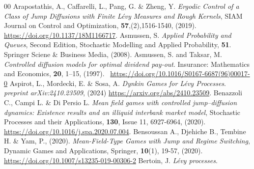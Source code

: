 \documentclass{article}
\begin{document}
\begin{thebibliography}{00}
Arapostathis, A., Caffarelli, L., Pang, G. \& Zheng, Y. \textit{Ergodic Control of a Class of Jump Diffusions with Finite Lévy Measures and Rough Kernels}, SIAM Journal on Control and Optimization,
\textbf{57},(2),1516-1540, (2019).
\url{https://doi.org/10.1137/18M1166717}.
Asmussen, S. \textit{Applied Probability and Queues}, Second Edition, Stochastic Modelling and Applied Probability, \textbf{51}. Springer Sciene \& Business Media, (2008). 
Asmussen, S. and Taksar, M. \textit{Controlled diffusion models for optimal dividend pay-out}. Insurance: Mathematics and Economics, \textbf{20}, 1–15, (1997). \ \url{https://doi.org/10.1016/S0167-6687(96)00017-0}
%
Aspirot, L., Mordecki, E. \& Sosa, A.
\textit{Dynkin Games for L\'evy Processes}.
 	\textit{preprint arXiv:2410.23509}, (2024)
      \url{https://arxiv.org/abs/2410.23509}.
 Benazzoli C., Campi L. \&  Di Persio L.
\textit{Mean field games with controlled jump–diffusion dynamics: Existence results and an illiquid interbank market model},
Stochastic Processes and their Applications,
\textbf{130}, Issue 11, 6927-6964, (2020).
\url{https://doi.org/10.1016/j.spa.2020.07.004}.
Bensoussan A., Djehiche B., Tembine H. \& Yam, P., (2020). \textit{Mean-Field-Type Games with Jump and Regime Switching},  Dynamic Games and Applications, Springer,  \textbf{10}(1),  19-57, (2020).
\url{https://doi.org/10.1007/s13235-019-00306-2}
Bertoin, J.
\textit{L\'evy processes}. 

\end{thebibliography}
\end{document}
